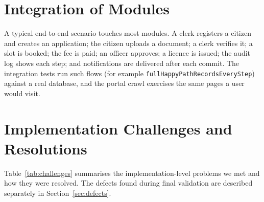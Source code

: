 \section{Integration of Modules}
A typical end-to-end scenario touches most modules. A clerk registers a citizen and creates
an application; the citizen uploads a document; a clerk verifies it; a slot is booked;
the fee is paid; an officer approves; a licence is issued; the audit log shows each step;
and notifications are delivered after each commit. The integration tests run such
flows (for example \texttt{fullHappyPathRecordsEveryStep}) against a real database, and the
portal crawl exercises the same pages a user would visit.

\section{Implementation Challenges and Resolutions}
Table~\ref{tab:challenges} summarises the implementation-level problems we met and how
they were resolved. The defects found during final validation are described separately in
Section~\ref{sec:defects}.

